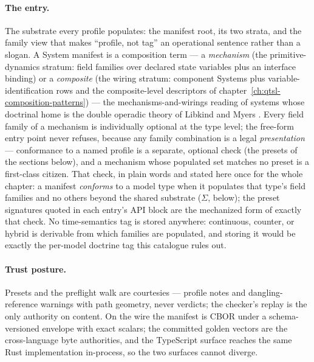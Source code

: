 \paragraph{The entry.} The substrate every profile populates: the
manifest root, its two strata, and the family view that makes
``profile, not tag'' an operational sentence rather than a slogan. A
System manifest is a composition term --- a \emph{mechanism} (the
primitive-dynamics stratum: field families over declared state
variables plus an interface binding) or a \emph{composite} (the wiring
stratum: component Systems plus variable-identification rows and the
composite-level descriptors of
chapter~\ref{ch:qtsl-composition-patterns}) --- the
mechanisms-and-wirings reading of systems whose doctrinal home is
the double operadic theory of Libkind and Myers \cite{libkind25}. Every field family of a
mechanism is individually optional at the type level; the free-form
entry point never refuses, because any family combination is a legal
\emph{presentation} --- conformance to a named profile is a separate,
optional check (the presets of the sections below), and a mechanism
whose populated set matches no preset is a first-class citizen. That
check, in plain words and stated here once for the whole chapter: a
manifest \emph{conforms} to a model type when it populates that
type's field families and no others beyond the shared substrate
($\Sigma$, below); the preset signatures quoted in each entry's API
block are the mechanized form of exactly that check. No
time-semantics tag is stored anywhere: continuous, counter, or hybrid
is derivable from which families are populated, and storing it would
be exactly the per-model doctrine tag this catalogue rules out.

\paragraph{Trust posture.} Presets and the preflight walk are
courtesies --- profile notes and dangling-reference warnings with path
geometry, never verdicts; the checker's replay is the only authority
on content. On the wire the manifest is CBOR under a schema-versioned
envelope with exact scalars; the committed golden vectors are the
cross-language byte authorities, and the TypeScript surface reaches
the same Rust implementation in-process, so the two surfaces cannot
diverge.

